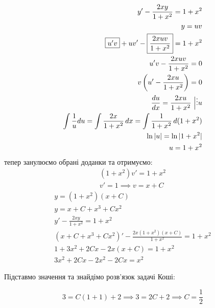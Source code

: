 \documentclass[../rgr_2.tex]{subfiles}
\begin{document}
\Solution

\begin{align}
	y'-\frac{2xy}{1+x^2}=1+x^2 \\
	y = uv \\
	\fbox{$u'v$}+uv'-\fbox{$\displaystyle\frac{2xuv}{1+x^2}$}=1+x^2 \\
	u'v-\frac{2xuv}{1+x^2}=0 \\
	v\left(u'-\frac{2xu}{1+x^2}\right)=0 \\ %
	\frac{du}{dx}=\frac{2xu}{1+x^2}~\Big|\vdots u \\
	\int \frac{1}{u} du=\int \frac{2x}{1+x^2}\,dx
	=\int\frac{1}{1+x^2}\,d(1+x^2) \\
	\ln|u|=\ln|1+x^2| \\
	u=1+x^2
\end{align}
тепер занулюємо обрані доданки та отримуємо:
\begin{align}
	(1+x^2)v'=1+x^2 \\
	v'=1 \implies v = x+C
\end{align}
\begin{align}
	y=(1+x^2)(x+C) \\ %
	y=x+C+x^3+Cx^2 \\ %
	y'-\frac{2xy}{1+x^2}=1+x^2 \\
	(x+C+x^3+Cx^2)'-\frac{2x(1+x^2)(x+C)}{1+x^2}=1+x^2 \\
	1+3x^2+2Cx-2x(x+C)=1+x^2 \\
	3x^2+2Cx-2x^2-2Cx=x^2 %
\end{align}

Підставмо значення та знайдімо розв'язок задачі Коші:

\begin{equation}
	3=C(1+1)+2
	\implies 3=2C+2
	\implies C=\frac{1}{2}
\end{equation}

\end{document}

